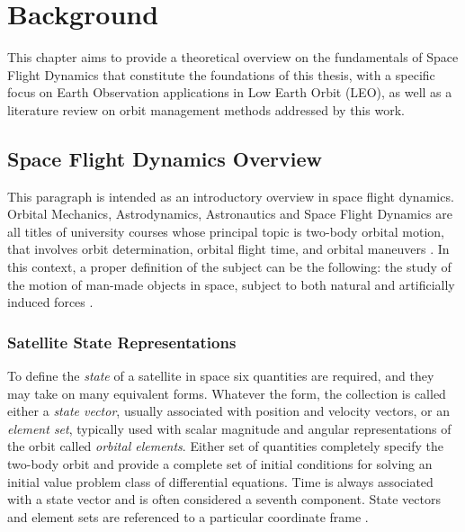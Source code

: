 \chapter{Background}

This chapter aims to provide a theoretical overview on the fundamentals of Space Flight Dynamics that constitute the foundations of this thesis, with a specific focus on Earth Observation applications in Low Earth Orbit (LEO), as well as a literature review on orbit management methods addressed by this work.

\section{Space Flight Dynamics Overview}

This paragraph is intended as an introductory overview in space flight dynamics. 
Orbital Mechanics, Astrodynamics, Astronautics and Space Flight Dynamics are all titles of university courses whose principal topic is two-body orbital motion, that involves orbit determination, orbital flight time, and orbital maneuvers \cite{kluever2018space}.
In this context, a proper definition of the subject can be the following: the study of the motion of man-made objects in space, subject to both natural and artificially induced forces \cite{griffin2004space}.

\subsection{Satellite State Representations}

To define the \textit{state} of a satellite in space six quantities are required, and they may take on many equivalent forms.
Whatever the form, the collection is called either a \textit{state vector}, usually associated with position and velocity vectors, or an \textit{element set}, typically used with scalar magnitude and angular representations of the orbit called \textit{orbital elements}.
Either set of quantities completely specify the two-body orbit and provide a complete set of initial conditions for solving an initial value problem class of differential equations. 
Time is always associated with a state vector and is often considered a seventh component.
State vectors and element sets are referenced to a particular coordinate frame \cite{vallado2013fundamentals}. 

